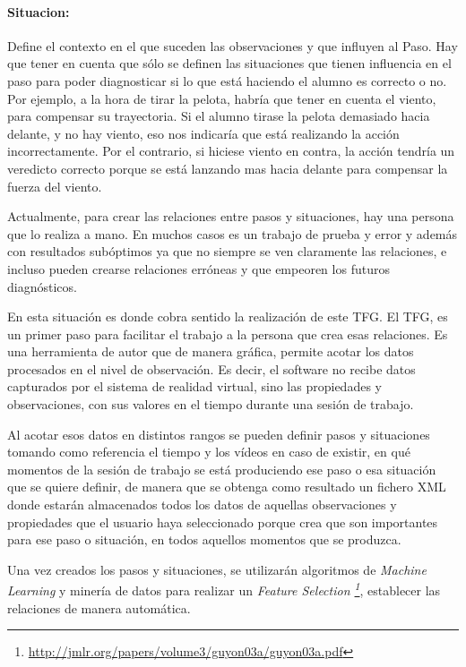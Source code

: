 \paragraph{\textbf{Situacion:}}
Define el contexto en el que suceden las observaciones y que influyen al Paso. Hay que
tener en cuenta que s\'olo se definen las situaciones que tienen influencia en el paso
para poder diagnosticar si lo que est\'a haciendo el alumno es correcto o no. Por ejemplo, a la hora
de tirar la pelota, habr\'ia que tener en cuenta el viento, para compensar su trayectoria. Si el alumno
tirase la pelota demasiado hacia delante, y no hay viento, eso nos indicar\'ia que est\'a realizando la acci\'on
incorrectamente. Por el contrario, si hiciese viento en contra, la acci\'on tendr\'ia un veredicto correcto
porque se est\'a lanzando mas hacia delante para compensar la fuerza del viento.

Actualmente, para crear las relaciones entre pasos y situaciones, hay una persona que lo realiza a mano. En muchos casos
es un trabajo de prueba y error y adem\'as con resultados sub\'optimos ya que no siempre se ven claramente las relaciones,
e incluso pueden crearse relaciones err\'oneas y que empeoren los futuros diagn\'osticos.

En esta situaci\'on es donde cobra sentido la realizaci\'on de este TFG. El TFG, es un primer paso para facilitar
el trabajo a la persona que crea esas relaciones. Es una herramienta de autor que de manera gr\'afica, permite
acotar los datos procesados en el nivel de observaci\'on. Es decir, el software no recibe datos capturados por
el sistema de realidad virtual, sino
las propiedades y observaciones, con sus valores en el tiempo durante una sesi\'on de trabajo.

Al acotar esos datos en distintos rangos se pueden definir pasos y situaciones tomando como referencia
el tiempo y los v\'ideos en caso de existir, en qu\'e momentos de la sesi\'on de trabajo
se est\'a produciendo ese paso o esa situaci\'on que se quiere definir, de manera que se obtenga
como resultado un fichero XML donde estar\'an almacenados todos los datos de aquellas observaciones y 
propiedades que el usuario haya seleccionado porque crea que son importantes para ese paso o situaci\'on,
en todos aquellos momentos que se produzca.

Una vez creados los pasos y situaciones, se utilizar\'an algoritmos de \emph{Machine Learning} y miner\'ia de datos para
realizar un \emph{Feature Selection \footnote{\url{http://jmlr.org/papers/volume3/guyon03a/guyon03a.pdf}}},
establecer las relaciones de manera autom\'atica.

